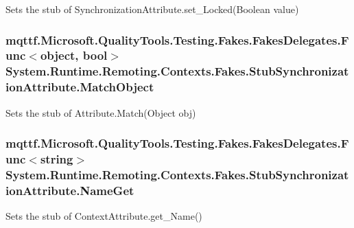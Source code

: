 Sets the stub of Synchronization\-Attribute.\-set\-\_\-\-Locked(\-Boolean value)

\hypertarget{class_system_1_1_runtime_1_1_remoting_1_1_contexts_1_1_fakes_1_1_stub_synchronization_attribute_accb0801c7d92f292ee2ce2e6dd7d39b8}{
\subsubsection[{Match\-Object}]{\setlength{\rightskip}{0pt plus 5cm}mqttf.\-Microsoft.\-Quality\-Tools.\-Testing.\-Fakes.\-Fakes\-Delegates.\-Func$<$object, bool$>$ System.\-Runtime.\-Remoting.\-Contexts.\-Fakes.\-Stub\-Synchronization\-Attribute.\-Match\-Object}}\label{class_system_1_1_runtime_1_1_remoting_1_1_contexts_1_1_fakes_1_1_stub_synchronization_attribute_accb0801c7d92f292ee2ce2e6dd7d39b8}


Sets the stub of Attribute.\-Match(\-Object obj)

\hypertarget{class_system_1_1_runtime_1_1_remoting_1_1_contexts_1_1_fakes_1_1_stub_synchronization_attribute_ab0a2defe962533d6d4fb6b7e44cdbd8d}{
\subsubsection[{Name\-Get}]{\setlength{\rightskip}{0pt plus 5cm}mqttf.\-Microsoft.\-Quality\-Tools.\-Testing.\-Fakes.\-Fakes\-Delegates.\-Func$<$string$>$ System.\-Runtime.\-Remoting.\-Contexts.\-Fakes.\-Stub\-Synchronization\-Attribute.\-Name\-Get}}\label{class_system_1_1_runtime_1_1_remoting_1_1_contexts_1_1_fakes_1_1_stub_synchronization_attribute_ab0a2defe962533d6d4fb6b7e44cdbd8d}


Sets the stub of Context\-Attribute.\-get\-\_\-\-Name()

